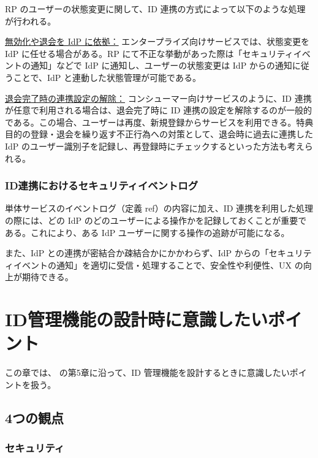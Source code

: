 \documentclass[uplatex]{jsarticle}
\def\ref#1{ref}%
\begin{document}
RP のユーザーの状態変更に関して、ID 連携の方式によって以下のような処理が行われる。

\underline{無効化や退会を IdP に依拠：}
エンタープライズ向けサービスでは、状態変更を IdP に任せる場合がある。RP にて不正な挙動があった際は「セキュリティイベントの通知」などで IdP に通知し、ユーザーの状態変更は IdP からの通知に従うことで、IdP と連動した状態管理が可能である。

\underline{退会完了時の連携設定の解除：}
コンシューマー向けサービスのように、ID 連携が任意で利用される場合は、退会完了時に ID 連携の設定を解除するのが一般的である。この場合、ユーザーは再度、新規登録からサービスを利用できる。特典目的の登録・退会を繰り返す不正行為への対策として、退会時に過去に連携した IdP のユーザー識別子を記録し、再登録時にチェックするといった方法も考えられる。

\subsubsection{ID連携におけるセキュリティイベントログ}

単体サービスのイベントログ（定義 \ref{dfn:security-event-log}）の内容に加え、ID 連携を利用した処理の際には、どの IdP のどのユーザーによる操作かを記録しておくことが重要である。これにより、ある IdP ユーザーに関する操作の追跡が可能になる。

また、IdP との連携が密結合か疎結合かにかかわらず、IdP からの「セキュリティイベントの通知」を適切に受信・処理することで、安全性や利便性、UX の向上が期待できる。

\section{ID管理機能の設計時に意識したいポイント}

この章では、\cite{Ito2026} の第5章に沿って、ID 管理機能を設計するときに意識したいポイントを扱う。

\subsection{4つの観点}

\subsubsection{セキュリティ}
\end{document}
